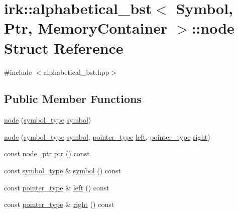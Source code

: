 \hypertarget{structirk_1_1alphabetical__bst_1_1node}{}\section{irk\+:\+:alphabetical\+\_\+bst$<$ Symbol, Ptr, Memory\+Container $>$\+:\+:node Struct Reference}
\label{structirk_1_1alphabetical__bst_1_1node}


{\ttfamily \#include $<$alphabetical\+\_\+bst.\+hpp$>$}

\subsection*{Public Member Functions}
\begin{DoxyCompactItemize}
\item 
\mbox{\hyperlink{structirk_1_1alphabetical__bst_1_1node_a5b892f196ffd2c8c732b7a230097dd42}{node}} (\mbox{\hyperlink{classirk_1_1alphabetical__bst_a296ccb8fa9fa9dce3b3c3beab0a5ca28}{symbol\+\_\+type}} \mbox{\hyperlink{structirk_1_1alphabetical__bst_1_1node_ad4eda9986a848303569207ecfd7c9252}{symbol}})
\item 
\mbox{\hyperlink{structirk_1_1alphabetical__bst_1_1node_add6fee4d8429568f4caa72a221279470}{node}} (\mbox{\hyperlink{classirk_1_1alphabetical__bst_a296ccb8fa9fa9dce3b3c3beab0a5ca28}{symbol\+\_\+type}} \mbox{\hyperlink{structirk_1_1alphabetical__bst_1_1node_ad4eda9986a848303569207ecfd7c9252}{symbol}}, \mbox{\hyperlink{classirk_1_1alphabetical__bst_ae689c05ab96a71769e24908d5c73765c}{pointer\+\_\+type}} \mbox{\hyperlink{structirk_1_1alphabetical__bst_1_1node_a995b2b1dfc64e83e43c4de3585f216f5}{left}}, \mbox{\hyperlink{classirk_1_1alphabetical__bst_ae689c05ab96a71769e24908d5c73765c}{pointer\+\_\+type}} \mbox{\hyperlink{structirk_1_1alphabetical__bst_1_1node_a0d8c0916eb71b6d6025660674ac964dd}{right}})
\item 
const \mbox{\hyperlink{structirk_1_1alphabetical__bst_1_1node__ptr}{node\+\_\+ptr}} \mbox{\hyperlink{structirk_1_1alphabetical__bst_1_1node_a9ec39a805a09afaf00b9bdb21ec5cb82}{ptr}} () const
\item 
const \mbox{\hyperlink{classirk_1_1alphabetical__bst_a296ccb8fa9fa9dce3b3c3beab0a5ca28}{symbol\+\_\+type}} \& \mbox{\hyperlink{structirk_1_1alphabetical__bst_1_1node_ad4eda9986a848303569207ecfd7c9252}{symbol}} () const
\item 
const \mbox{\hyperlink{classirk_1_1alphabetical__bst_ae689c05ab96a71769e24908d5c73765c}{pointer\+\_\+type}} \& \mbox{\hyperlink{structirk_1_1alphabetical__bst_1_1node_a995b2b1dfc64e83e43c4de3585f216f5}{left}} () const
\item 
const \mbox{\hyperlink{classirk_1_1alphabetical__bst_ae689c05ab96a71769e24908d5c73765c}{pointer\+\_\+type}} \& \mbox{\hyperlink{structirk_1_1alphabetical__bst_1_1node_a0d8c0916eb71b6d6025660674ac964dd}{right}} () const
\end{DoxyCompactItemize}
